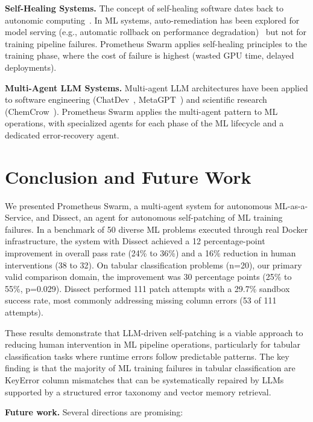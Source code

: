 \documentclass[conference]{IEEEtran}
\begin{document}
\textbf{Self-Healing Systems.} The concept of self-healing software dates back to
autonomic computing~\cite{kephart2003vision}. In ML systems, auto-remediation has been
explored for model serving (e.g., automatic rollback on performance
degradation)~\cite{zhang2017understanding} but not for training pipeline failures.
Prometheus Swarm applies self-healing principles to the training phase, where the cost of
failure is highest (wasted GPU time, delayed deployments).

\textbf{Multi-Agent LLM Systems.} Multi-agent LLM architectures have been applied to
software engineering (ChatDev~\cite{qian2023chatdev},
MetaGPT~\cite{hong2024metagpt}) and scientific research (ChemCrow~\cite{bran2023augmenting}).
Prometheus Swarm applies the multi-agent pattern to ML operations, with specialized
agents for each phase of the ML lifecycle and a dedicated error-recovery agent.

\section{Conclusion and Future Work}

We presented Prometheus Swarm, a multi-agent system for autonomous ML-as-a-Service, and
Dissect, an agent for autonomous self-patching of ML training failures. In a benchmark of
50 diverse ML problems executed through real Docker infrastructure, the system with
Dissect achieved a 12 percentage-point improvement in overall pass rate (24\% to 36\%)
and a 16\% reduction in human interventions (38 to 32). On tabular classification problems
(n=20), our primary valid comparison domain, the improvement was 30 percentage points
(25\% to 55\%, p=0.029). Dissect performed 111 patch attempts with a 29.7\% sandbox
success rate, most commonly addressing missing column errors (53 of 111 attempts).

These results demonstrate that LLM-driven self-patching is a viable approach to reducing
human intervention in ML pipeline operations, particularly for tabular classification
tasks where runtime errors follow predictable patterns. The key finding is that the
majority of ML training failures in tabular classification are KeyError column mismatches
that can be systematically repaired by LLMs supported by a structured error taxonomy and
vector memory retrieval.

\textbf{Future work.} Several directions are promising:
\end{document}
